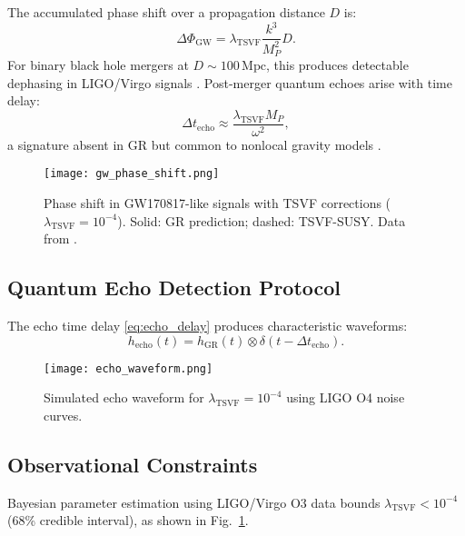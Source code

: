 \documentclass[twocolumn,superscriptaddress,floatfix]{revtex4-2}
\newcommand{\tsvf}{\lambda_{\text{TSVF}}}
\begin{document}
The accumulated phase shift over a propagation distance \(D\) is:  
\begin{equation}  
\Delta\Phi_{\text{GW}} = \lambda_{\text{TSVF}}\frac{k^3}{M_P^2}D.  
\label{eq:phase_shift}  
\end{equation}  
For binary black hole mergers at \(D \sim 100 \, \text{Mpc}\), this produces detectable dephasing in LIGO/Virgo signals \cite{LIGO2021}. Post-merger quantum echoes arise with time delay:  
\begin{equation}  
\Delta t_{\text{echo}} \approx \frac{\lambda_{\text{TSVF}}M_P}{\omega^2},  
\label{eq:echo_delay}  
\end{equation}  
a signature absent in GR but common to nonlocal gravity models \cite{Biswas2003}.  

\begin{figure}[!htbp]  
\centering  
\texttt{[image: gw\_phase\_shift.png]}  
\caption{Phase shift in GW170817-like signals with TSVF corrections (\(\lambda_{\text{TSVF}} = 10^{-4}\)). Solid: GR prediction; dashed: TSVF-SUSY. Data from \cite{LIGO2017}.}  
\label{fig:gw_phase}  
\end{figure}  

\subsection{Quantum Echo Detection Protocol} 
\label{subsec:echo_protocol}  
The echo time delay \eqref{eq:echo_delay} produces characteristic waveforms:  
\begin{equation}  
h_{\text{echo}}(t) = h_{\text{GR}}(t) \otimes \delta(t - \Delta t_{\text{echo}}).  
\end{equation}  
\begin{figure}[htbp]  
\centering  
\texttt{[image: echo\_waveform.png]} 
\caption{Simulated echo waveform for \(\tsvf = 10^{-4}\) using LIGO O4 noise curves.}  
\label{fig:echo}  
\end{figure}  
\subsection{Observational Constraints}  
\label{subsec:constraints}  

Bayesian parameter estimation using LIGO/Virgo O3 data \cite{Virgo2021} bounds \(\lambda_{\text{TSVF}} < 10^{-4}\) (68\% credible interval), as shown in Fig.~\ref{fig:gw_phase}.  
\end{document}
